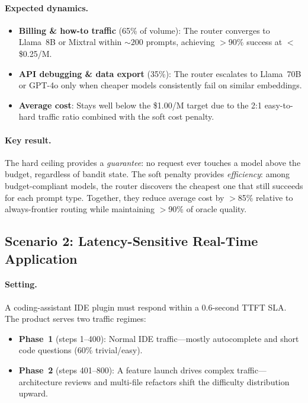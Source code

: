 \paragraph{Expected dynamics.}

\begin{itemize}[nosep,leftmargin=*]
    \item \textbf{Billing \& how-to traffic} (65\% of volume): The router converges to Llama~8B or Mixtral within ${\sim}200$ prompts, achieving $>$90\% success at $<$\$0.25/M.
    \item \textbf{API debugging \& data export} (35\%): The router escalates to Llama~70B or GPT-4o only when cheaper models consistently fail on similar embeddings.
    \item \textbf{Average cost}: Stays well below the \$1.00/M target due to the 2:1 easy-to-hard traffic ratio combined with the soft cost penalty.
\end{itemize}

\paragraph{Key result.}
The hard ceiling provides a \emph{guarantee}: no request ever touches a model above the budget, regardless of bandit state.  The soft penalty provides \emph{efficiency}: among budget-compliant models, the router discovers the cheapest one that still succeeds for each prompt type.  Together, they reduce average cost by $>$85\% relative to always-frontier routing while maintaining $>$90\% of oracle quality.


\subsection{Scenario 2: Latency-Sensitive Real-Time Application}
\label{app:scenario_latency}

\paragraph{Setting.}
A coding-assistant IDE plugin must respond within a 0.6-second TTFT SLA.  The product serves two traffic regimes:

\begin{itemize}[nosep,leftmargin=*]
    \item \textbf{Phase~1} (steps 1--400): Normal IDE traffic---mostly autocomplete and short code questions (60\% trivial/easy).
    \item \textbf{Phase~2} (steps 401--800): A feature launch drives complex traffic---architecture reviews and multi-file refactors shift the difficulty distribution upward.
\end{itemize}

